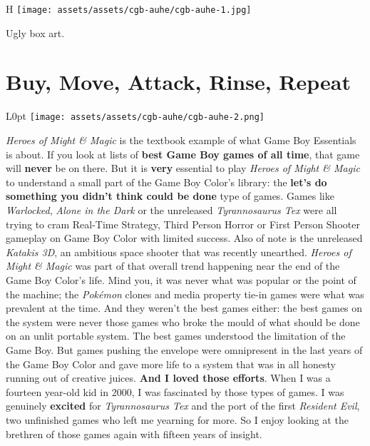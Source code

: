 \documentclass{book}
\begin{document}
\begin{wrapfigure}{H}{\linewidth}
\vskip 4pt
\centering \texttt{[image: assets/assets/cgb-auhe/cgb-auhe-1.jpg]}\par\pagetwodescription Ugly box art.\end{wrapfigure}
\clearpage

\FloatBarrier\needspace{5pt}\section*{Buy, Move, Attack, Rinse, Repeat}\nopagebreak[4]

\begin{wrapfigure}{L}{0pt} \texttt{[image: assets/assets/cgb-auhe/cgb-auhe-2.png]}\end{wrapfigure}
\emph{Heroes of Might \& Magic} is the textbook example of what Game Boy Essentials is about. If you look at lists of \textbf{best Game Boy games of all time}, that game will \textbf{never} be on there. But it is \textbf{very} essential to play \emph{Heroes of Might \& Magic} to understand a small part of the Game Boy Color’s library: the \textbf{let’s do something you didn’t think could be done} type of games. Games like \emph{Warlocked}, \emph{Alone in the Dark} or the unreleased \emph{Tyrannosaurus Tex} were all trying to cram Real-Time Strategy, Third Person Horror or First Person Shooter gameplay on Game Boy Color with limited success. Also of note is the unreleased \emph{Katakis 3D}, an ambitious space shooter that was recently unearthed. \emph{Heroes of Might \& Magic} was part of that overall trend happening near the end of the Game Boy Color’s life. Mind you, it was never what was popular or the point of the machine; the \emph{Pokémon} clones and media property tie-in games were what was prevalent at the time. And they weren’t the best games either: the best games on the system were never those games who broke the mould of what should be done on an unlit portable system. The best games understood the limitation of the Game Boy. But games pushing the envelope were omnipresent in the last years of the Game Boy Color and gave more life to a system that was in all honesty running out of creative juices. \textbf{And I loved those efforts}. When I was a fourteen year-old kid in 2000, I was fascinated by those types of games. I was genuinely \textbf{excited} for \emph{Tyrannosaurus Tex} and the port of the first \emph{Resident Evil}, two unfinished games who left me yearning for more. So I enjoy looking at the brethren of those games again with fifteen years of insight.
\end{document}
